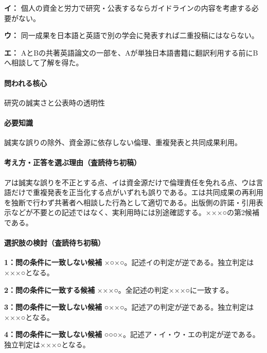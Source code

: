 \noindent\textbf{イ：} 個人の資金と労力で研究・公表するならガイドラインの内容を考慮する必要がない。\par

\noindent\textbf{ウ：} 同一成果を日本語と英語で別の学会に発表すれば二重投稿にはならない。\par

\noindent\textbf{エ：} AとBの共著英語論文の一部を、Aが単独日本語書籍に翻訳利用する前にBへ相談して了解を得た。\par

\paragraph{問われる核心} 研究の誠実さと公表時の透明性

\paragraph{必要知識} 誠実な誤りの除外、資金源に依存しない倫理、重複発表と共同成果利用。

\paragraph{考え方・正答を選ぶ理由（査読待ち初稿）} アは誠実な誤りを不正とする点、イは資金源だけで倫理責任を免れる点、ウは言語だけで重複発表を正当化する点がいずれも誤りである。エは共同成果の再利用を独断で行わず共著者へ相談した行為として適切である。出版側の許諾・引用表示などが不要との記述ではなく、実利用時には別途確認する。×××○の第2候補である。

\paragraph{選択肢の検討（査読待ち初稿）}\mbox{}\par

\noindent\textbf{1：問の条件に一致しない候補} ×○×○。記述イの判定が逆である。独立判定は×××○となる。\par

\noindent\textbf{2：問の条件に一致する候補} ×××○。全記述の判定×××○に一致する。\par

\noindent\textbf{3：問の条件に一致しない候補} ○××○。記述アの判定が逆である。独立判定は×××○となる。\par

\noindent\textbf{4：問の条件に一致しない候補} ○○○×。記述ア・イ・ウ・エの判定が逆である。独立判定は×××○となる。\par

